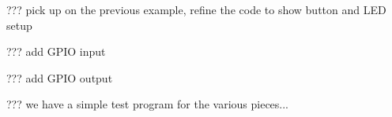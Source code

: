 


??? pick up on the previous example, refine the code to show button and LED setup



??? add GPIO input


??? add GPIO output



??? we have a simple test program for the various pieces...



